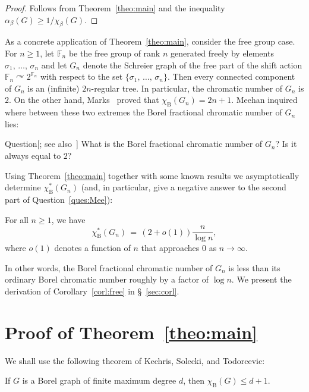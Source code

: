 \documentclass[AHL,Unicode,longabstracts,published]{cedram}
\newcommand{\0}{\varnothing}
\newcommand{\set}[1]{\{#1\}}
\renewcommand{\leq}{\leqslant}
\renewcommand{\geq}{\geqslant}
\newcommand{\F}{\mathbb{F}}
\newcommand{\rmB}{\mathrm{B}}
\begin{document}
\begin{proof}
Follows from Theorem~\ref{theo:main} and the inequality $\alpha_\beta(G) \geq 1/\chi_\beta(G)$.
\end{proof}

As a concrete application of Theorem~\ref{theo:main}, consider the free group case. For $n \geq 1$, let $\F_n$ be the free group of rank $n$ generated freely by elements $\sigma_1,\, \ldots,\,\sigma_n$ and let $G_n$ denote the Schreier graph of the free part of the shift action $\F_n \curvearrowright 2^{\F_n}$ with respect to the set $\set{\sigma_1,\,\ldots,\, \sigma_n}$. Then every connected component of $G_n$ is an (infinite) $2n$-regular tree. In particular, the chromatic number of $G_n$ is $2$. On the other hand, Marks~\cite{Marks} proved that $\chi_{\rmB}(G_n) = 2n+1$. Meehan inquired where between these two extremes the Borel fractional chromatic number of $G_n$ lies:

\begin{enonce}[plain]{Question}[{\cite[Question~4.6.3]{Mee}; see also~\cite[Problem~8.17]{KechrisMarks}}]\label{ques:Mee}
What is the Borel fractional chromatic number of $G_n$? Is it always equal to $2$?
\end{enonce}

Using Theorem~\ref{theo:main} together with some known results we asymptotically determine $\chi_\rmB^\ast(G_n)$ (and, in particular, give a negative answer to the second part of Question~\ref{ques:Mee}):

\begin{coro}\label{corl:free}
For all $n \geq 1$, we have
\[
\chi_\rmB^\ast(G_n) \,=\, (2+o(1))\frac{n}{\log n},
\]
where $o(1)$ denotes a function of $n$ that approaches $0$ as $n \to \infty$.
\end{coro}

In other words, the Borel fractional chromatic number of $G_n$ is less than its ordinary Borel chromatic number roughly by a factor of $\log n$. We present the derivation of Corollary~\ref{corl:free} in \S~\ref{sec:corl}.

\section{Proof of Theorem~\ref{theo:main}}\label{sec:proof}

We shall use the following theorem of Kechris, Solecki, and Todorcevic:

\begin{theo}\label{theo:KST}
If $G$ is a Borel graph of finite maximum degree $d$, then $\chi_\rmB(G) \leq d+1$.
\end{theo}
\end{document}
